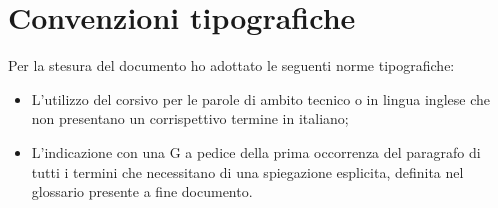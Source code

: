 
\cleardoublepage
{}
{}
\begingroup
\let\clearpage\relax
\let\cleardoublepage\relax
\let\cleardoublepage\relax

\chapter*{Convenzioni tipografiche}

Per la stesura del documento ho adottato le seguenti norme tipografiche:\\

\begin{itemize}
	\item L'utilizzo del corsivo per le parole di ambito tecnico o in lingua inglese che non presentano un corrispettivo termine in italiano; 
	\item L'indicazione con una G a pedice della prima occorrenza del paragrafo di tutti i termini che necessitano di una spiegazione esplicita, definita nel glossario presente a fine documento.
\end{itemize}



%
%

\endgroup			

\vfill

